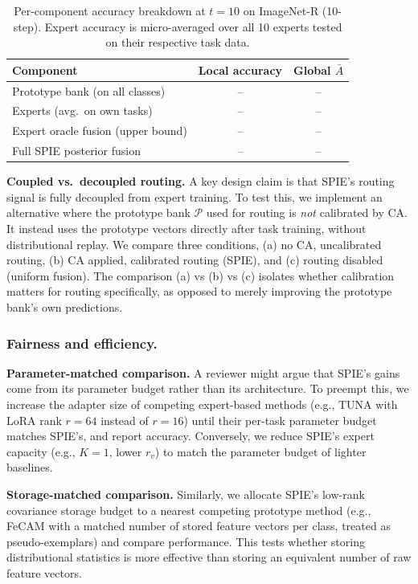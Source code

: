 \begin{table}[h]
\centering
\caption{Per-component accuracy breakdown at $t=10$ on ImageNet-R (10-step). Expert accuracy is micro-averaged over all 10 experts tested on their respective task data.}
\label{tab:per_component}
\small
\begin{tabular}{lcc}
\toprule
Component & Local accuracy & Global $\bar{A}$ \\
\midrule
Prototype bank (on all classes)       & -- & -- \\
Experts (avg.\ on own tasks)                                     & -- & -- \\
Expert oracle fusion (upper bound)                               & -- & -- \\
Full SPIE posterior fusion                                       & -- & -- \\
\bottomrule
\end{tabular}
\end{table}

\textbf{Coupled vs.\ decoupled routing.}
A key design claim is that SPIE's routing signal is fully decoupled from expert training. To test this, we implement an alternative where the prototype bank $\mathcal{P}$ used for routing is \emph{not} calibrated by CA. It instead uses the prototype vectors directly after task training, without distributional replay. We compare three conditions, (a) no CA, uncalibrated routing, (b) CA applied, calibrated routing (SPIE), and (c) routing disabled (uniform fusion). The comparison (a) vs (b) vs (c) isolates whether calibration matters for routing specifically, as opposed to merely improving the prototype bank's own predictions.

\subsubsection{Fairness and efficiency.}

\textbf{Parameter-matched comparison.}
A reviewer might argue that SPIE's gains come from its parameter budget rather than its architecture. To preempt this, we increase the adapter size of competing expert-based methods (e.g., TUNA with LoRA rank $r=64$ instead of $r=16$) until their per-task parameter budget matches SPIE's, and report accuracy. Conversely, we reduce SPIE's expert capacity (e.g., $K=1$, lower $r_v$) to match the parameter budget of lighter baselines.

\textbf{Storage-matched comparison.}
Similarly, we allocate SPIE's low-rank covariance storage budget to a nearest competing prototype method (e.g., FeCAM with a matched number of stored feature vectors per class, treated as pseudo-exemplars) and compare performance. This tests whether storing distributional statistics is more effective than storing an equivalent number of raw feature vectors.

